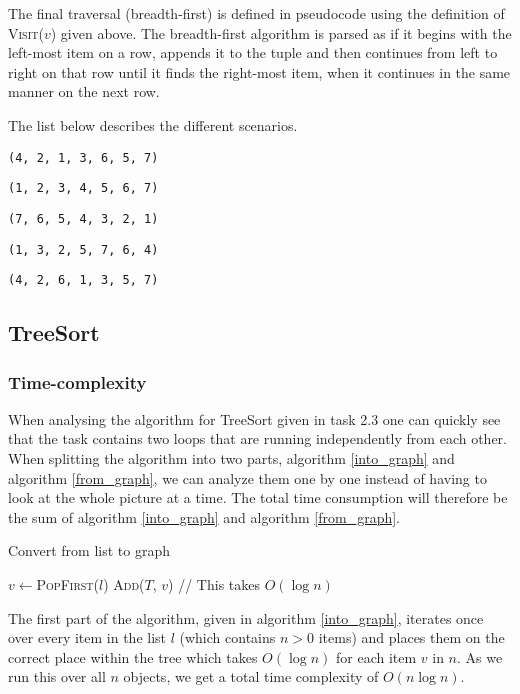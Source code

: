 \documentclass[a4paper,11pt]{article}
\begin{document}
The final traversal (breadth-first) is defined in pseudocode using the definition of \textsc{Visit}($v$) given above. The breadth-first algorithm is parsed as if it begins with the left-most item on a row, appends it to the tuple and then continues from left to right on that row until it finds the right-most item, when it continues in the same manner on the next row.

The list below describes the different scenarios.

\begin{description}[style=multiline,leftmargin=6cm]
\item[Pre-order] \texttt{(4, 2, 1, 3, 6, 5, 7)}
\item[In-order (Ascending)] \texttt{(1, 2, 3, 4, 5, 6, 7)}
\item[In-order (Descending)] \texttt{(7, 6, 5, 4, 3, 2, 1)}
\item[Post-order] \texttt{(1, 3, 2, 5, 7, 6, 4)}
\item[Breadth-first] \texttt{(4, 2, 6, 1, 3, 5, 7)}
\end{description}
\newpage
\subsection{TreeSort}
\subsubsection{Time-complexity}
When analysing the algorithm for TreeSort given in task 2.3 one can quickly see that the task contains two loops that are running independently from each other. When splitting the algorithm into two parts, algorithm \ref{into_graph} and algorithm \ref{from_graph}, we can analyze them one by one instead of having to look at the whole picture at a time. The total time consumption will therefore be the sum of algorithm \ref{into_graph} and algorithm \ref{from_graph}.

\begin{algorithm}
\caption{Convert from list to graph}
\label{into_graph}

\begin{algorithmic}
\State $v\gets$\textsc{PopFirst}($l$)
\State \textsc{Add}($T$, $v$) // This takes $O(\log n)$
\EndWhile
\end{algorithmic}
\end{algorithm}

The first part of the algorithm, given in algorithm \ref{into_graph}, iterates once over every item in the list $l$ (which contains $n > 0$ items) and places them on the correct place within the tree which takes $O(\log n)$ for each item $v$ in $n$. As we run this over all $n$ objects, we get a total time complexity of $O(n \log n)$.
\end{document}
